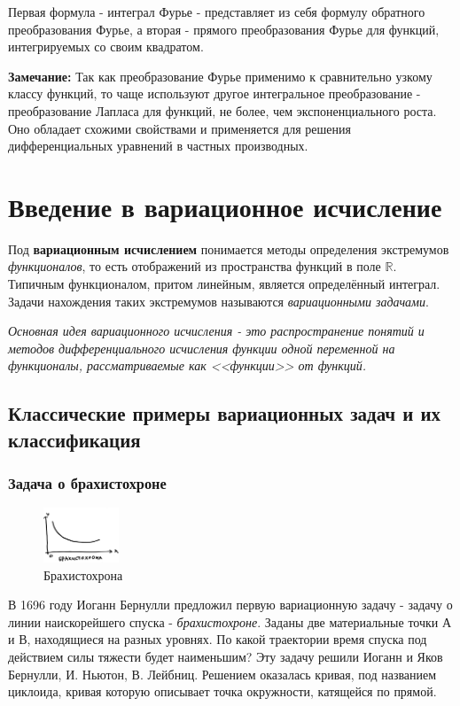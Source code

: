 \documentclass[12pt, a4paper]{article}
\begin{document}
Первая формула - интеграл Фурье - представляет из себя формулу обратного преобразования Фурье, а вторая - прямого преобразования Фурье для функций, интегрируемых со своим квадратом.

\textbf{Замечание:} Так как преобразование Фурье применимо к сравнительно узкому классу функций, то чаще используют другое интегральное преобразование - преобразование Лапласа для функций, не более, чем экспоненциального роста. Оно обладает схожими свойствами и применяется для решения дифференциальных уравнений в частных производных.

\section{Введение в вариационное исчисление}

Под \textbf{вариационным исчислением} понимается методы определения экстремумов \textit{функционалов}, то есть отображений из пространства функций в поле $\mathbb{R}$. Типичным функционалом, притом линейным, является определённый интеграл. Задачи нахождения таких экстремумов называются \textit{вариационными задачами}.

\textit{Основная идея вариационного исчисления - это распространение понятий и методов дифференциального исчисления функции одной переменной на функционалы, рассматриваемые как <<функции>> от функций.}

\subsection{Классические примеры вариационных задач и их классификация}

\subsubsection{Задача о брахистохроне}

\begin{figure}
  \centering
  \includegraphics[width=0.2\textwidth]{17}
  \vspace{-4mm}
  \caption{Брахистохрона}
\end{figure}

В 1696 году Иоганн Бернулли предложил первую вариационную задачу - задачу о линии наискорейшего спуска - \textit{брахистохроне}. Заданы две материальные точки А и В, находящиеся на разных уровнях. По какой траектории
время спуска под действием силы тяжести будет наименьшим? Эту задачу решили Иоганн и Яков Бернулли, И. Ньютон, В.
Лейбниц. Решением оказалась кривая, под названием циклоида, кривая которую описывает точка окружности, катящейся по прямой.
\end{document}

